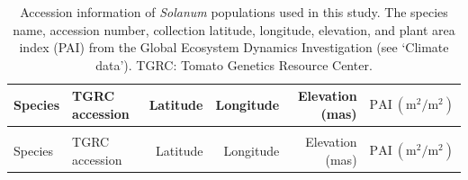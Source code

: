 \documentclass[
  letterpaper,
  DIV=11,
  numbers=noendperiod]{scrartcl}
\begin{document}
\begin{longtable}{>{\raggedright\arraybackslash}p{3.25cm}lrrrr}

\caption{\label{tbl-populations}Accession information of \emph{Solanum}
populations used in this study. The species name, accession number,
collection latitude, longitude, elevation, and plant area index (PAI)
from the Global Ecosystem Dynamics Investigation (see `Climate data').
TGRC: Tomato Genetics Resource Center.}

\tabularnewline

\toprule
Species & TGRC accession & Latitude & Longitude & Elevation (mas) & $\mathrm{PAI}~(\unit{\meter\squared\per\meter\squared})$\\
\midrule
\endfirsthead
\multicolumn{6}{@{}l}{\textit{(continued)}}\\
\toprule
Species & TGRC accession & Latitude & Longitude & Elevation (mas) & $\mathrm{PAI}~(\unit{\meter\squared\per\meter\squared})$\\
\midrule
\endhead


\end{longtable}
\end{document}
